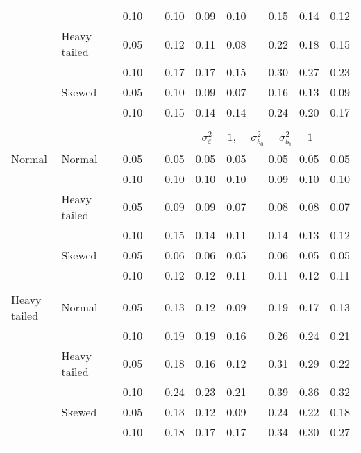 \begin{table}[ht]
\begin{scriptsize}
\begin{tabular}{ll p{.1cm} c p{.1cm} rrr p{.1cm} rrr}
             &              && 0.10 &&  0.10 & 0.09 & 0.10 && 0.15 & 0.14 & 0.12 \\ 
             & Heavy tailed && 0.05 &&  0.12 & 0.11 & 0.08 && 0.22 & 0.18 & 0.15 \\ 
             &              && 0.10 &&  0.17 & 0.17 & 0.15 && 0.30 & 0.27 & 0.23 \\ 
             & Skewed       && 0.05 &&  0.10 & 0.09 & 0.07 && 0.16 & 0.13 & 0.09 \\ 
             &              && 0.10 &&  0.15 & 0.14 & 0.14 && 0.24 & 0.20 & 0.17 \\ 

&&&&&&&&&&&\\
& && && \multicolumn{7}{c}{$\sigma_{\varepsilon}^2 = 1$, \ \ $\sigma_{b_0}^2 = \sigma_{b_1}^2 = 1$} \\ \cline{6-12}
\rowcolor{gray!20}Normal       & Normal       && 0.05 &&  0.05 & 0.05 & 0.05 && 0.05 & 0.05 & 0.05 \\ 
\rowcolor{gray!20}             &              && 0.10 &&  0.10 & 0.10 & 0.10 && 0.09 & 0.10 & 0.10 \\ 
\rowcolor{gray!20}             & Heavy tailed && 0.05 &&  0.09 & 0.09 & 0.07 && 0.08 & 0.08 & 0.07 \\ 
\rowcolor{gray!20}             &              && 0.10 &&  0.15 & 0.14 & 0.11 && 0.14 & 0.13 & 0.12 \\ 
\rowcolor{gray!20}             & Skewed       && 0.05 &&  0.06 & 0.06 & 0.05 && 0.06 & 0.05 & 0.05 \\ 
\rowcolor{gray!20}             &              && 0.10 &&  0.12 & 0.12 & 0.11 && 0.11 & 0.12 & 0.11 \\ 
             &&&&&&&&&&&\\
Heavy tailed & Normal       && 0.05 &&  0.13 & 0.12 & 0.09 && 0.19 & 0.17 & 0.13 \\ 
             &              && 0.10 &&  0.19 & 0.19 & 0.16 && 0.26 & 0.24 & 0.21 \\ 
             & Heavy tailed && 0.05 &&  0.18 & 0.16 & 0.12 && 0.31 & 0.29 & 0.22 \\ 
             &              && 0.10 &&  0.24 & 0.23 & 0.21 && 0.39 & 0.36 & 0.32 \\ 
             & Skewed       && 0.05 &&  0.13 & 0.12 & 0.09 && 0.24 & 0.22 & 0.18 \\ 
             &              && 0.10 &&  0.18 & 0.17 & 0.17 && 0.34 & 0.30 & 0.27 \\
             &&&&&&&&&&&\\ 

\end{tabular}
\end{scriptsize}
\end{table}
